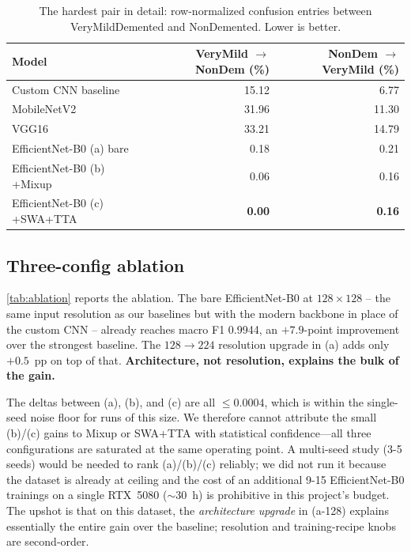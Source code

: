 \documentclass[journal,onecolumn,11pt]{IEEEtran}
\begin{document}
\begin{table}[t]
  \centering
  \small
  \caption{The hardest pair in detail: row-normalized confusion entries
  between VeryMildDemented and NonDemented. Lower is better.}
  \label{tab:vmnd_confusion}
  \begin{tabular}{l@{\hskip 14pt}r@{\hskip 14pt}r}
    \toprule
    \textbf{Model} & \textbf{VeryMild $\to$ NonDem (\%)} & \textbf{NonDem $\to$ VeryMild (\%)} \\
    \midrule
    Custom CNN baseline           & 15.12 & 6.77 \\
    MobileNetV2                   & 31.96 & 11.30 \\
    VGG16                         & 33.21 & 14.79 \\
    \midrule
    EfficientNet-B0 (a) bare      & 0.18 & 0.21 \\
    EfficientNet-B0 (b) +Mixup    & 0.06 & 0.16 \\
    EfficientNet-B0 (c) +SWA+TTA  & \textbf{0.00} & \textbf{0.16} \\
    \bottomrule
  \end{tabular}
\end{table}

\subsection{Three-config ablation}

\cref{tab:ablation} reports the ablation. The bare EfficientNet-B0 at
$128{\times}128$ -- the same input resolution as our baselines but with the
modern backbone in place of the custom CNN -- already reaches macro F1
0.9944, an $+7.9$-point improvement over the strongest baseline. The
$128 \to 224$ resolution upgrade in (a) adds only $+0.5$~pp on top of that.
\textbf{Architecture, not resolution, explains the bulk of the gain.}

The deltas between (a), (b), and (c) are all $\leq 0.0004$, which is within
the single-seed noise floor for runs of this size. We therefore cannot
attribute the small (b)/(c) gains to Mixup or SWA+TTA with statistical
confidence---all three configurations are saturated at the same operating
point. A multi-seed study (3-5 seeds) would be needed to rank (a)/(b)/(c)
reliably; we did not run it because the dataset is already at ceiling and
the cost of an additional 9-15 EfficientNet-B0 trainings on a single
RTX~5080 ($\sim$30~h) is prohibitive in this project's budget. The upshot
is that on this dataset, the \emph{architecture upgrade} in (a-128)
explains essentially the entire gain over the baseline; resolution and
training-recipe knobs are second-order.
\end{document}
